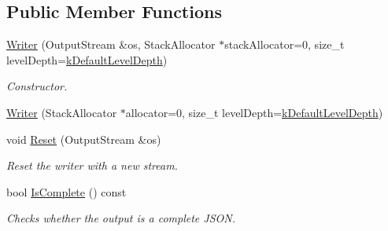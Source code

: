\subsection*{Public Member Functions}
\begin{DoxyCompactItemize}
\item 
\hyperlink{classWriter_a27998a2e0fcb0aa23c95e1330b340abc}{Writer} (Output\+Stream \&os, Stack\+Allocator $\ast$stack\+Allocator=0, size\+\_\+t level\+Depth=\hyperlink{classWriter_aad47efc97708b2a64e4a0994cbbfae25}{k\+Default\+Level\+Depth})
\begin{DoxyCompactList}\small\item\em Constructor. \end{DoxyCompactList}\item 
\hyperlink{classWriter_a2a6c946bc2a9dcfdda9f958c3cfee66c}{Writer} (Stack\+Allocator $\ast$allocator=0, size\+\_\+t level\+Depth=\hyperlink{classWriter_aad47efc97708b2a64e4a0994cbbfae25}{k\+Default\+Level\+Depth})
\item 
void \hyperlink{classWriter_a4e5bd5e6364edca476125b511b3dca9c}{Reset} (Output\+Stream \&os)
\begin{DoxyCompactList}\small\item\em Reset the writer with a new stream. \end{DoxyCompactList}\item 
bool \hyperlink{classWriter_aced42429d1b31a565c5ca0310bf4e276}{Is\+Complete} () const 
\begin{DoxyCompactList}\small\item\em Checks whether the output is a complete J\+S\+ON. \end{DoxyCompactList}\end{DoxyCompactItemize}
